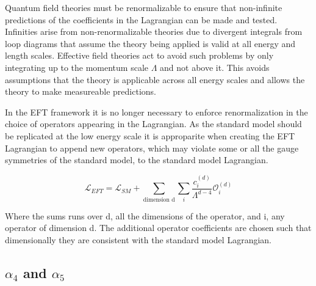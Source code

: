 Quantum field theories must be renormalizable to ensure that non-infinite predictions of the coefficients in the Lagrangian can be made and tested.  Infinities arise from non-renormalizable theories due to divergent integrals from loop diagrams that assume the theory being applied is valid at all energy and length scales.  Effective field theories act to avoid such problems by only integrating up to the momentum scale $\Lambda$ and not above it.  This avoids assumptions that the theory is applicable across all energy scales and allows the theory to make measureable predictions.  

In the EFT framework it is no longer necessary to enforce renormalization in the choice of operators appearing in the Lagrangian.  As the standard model should be replicated at the low energy scale it is approparite when creating the EFT Lagrangian to append new operators, which may violate some or all the gauge symmetries of the standard model, to the standard model Lagrangian.

\begin{equation}
\mathcal{L}_{EFT} = \mathcal{L}_{SM} + \sum_{\text{dimension d}} \sum_{i} \frac{c_{i}^{(d)}}{\Lambda^{d-4}} \mathcal{O}_{i}^{(d)}
\end{equation}

Where the sums runs over d, all the dimensions of the operator, and i, any operator of dimension d.  The additional operator coefficients are chosen such that dimensionally they are consistent with the standard model Lagrangian.  

\subsection{$\alpha_{4}$ and $\alpha_{5}$}




